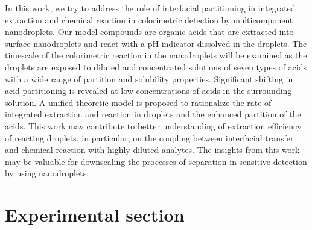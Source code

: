 \documentclass[journal=langd5,manuscript=article]{achemso}
\begin{document}
In this work, we try to address the role of interfacial partitioning in integrated extraction and chemical reaction in colorimetric detection by multicomponent nanodroplets. Our model compounds are organic acids that are extracted into surface nanodroplets and react with a pH indicator dissolved in the droplets.  The timescale of the colorimetric reaction in the nanodroplets will be examined as the droplets are exposed to diluted and concentrated solutions of seven types of acids with a wide range of partition and solubility properties. Significant shifting in acid partitioning is revealed at low concentrations of acids in the surrounding solution. A unified theoretic model is proposed to rationalize the rate of integrated extraction and reaction in droplets and the enhanced partition of the acids. This work may contribute to better understanding of extraction efficiency of reacting droplets, in particular, on the coupling  between interfacial transfer and chemical reaction with highly diluted analytes. The insights from this work may be valuable for downscaling the processes of separation in sensitive detection by using nanodroplets. 


\section{Experimental section}
\end{document}
